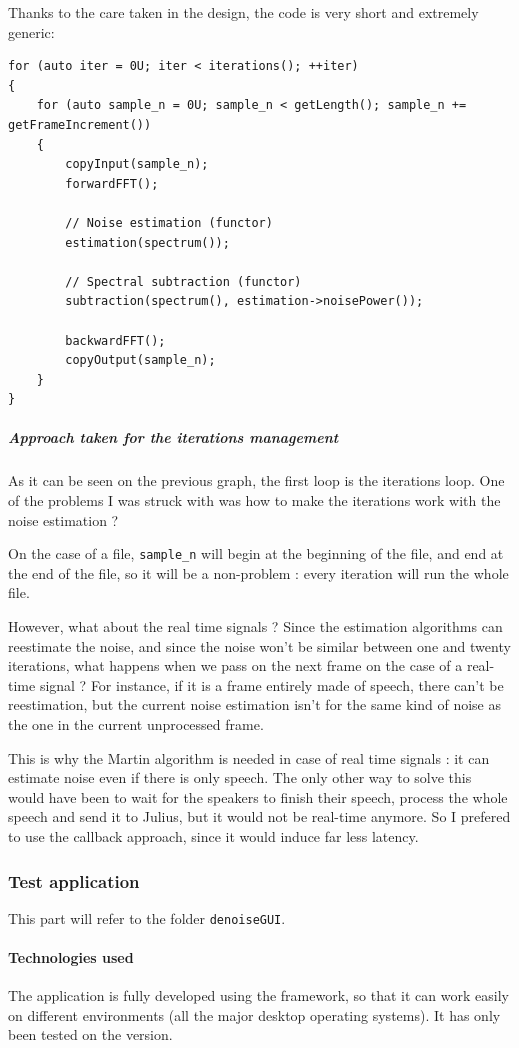 Thanks to the care taken in the design, the code is very short and extremely generic: 
\begin{lstlisting}[caption=\texttt{SubtractionManager::execute()} in subtraction\_manager.cpp]
for (auto iter = 0U; iter < iterations(); ++iter)
{
	for (auto sample_n = 0U; sample_n < getLength(); sample_n += getFrameIncrement())
	{
		copyInput(sample_n);
		forwardFFT();

		// Noise estimation (functor)
		estimation(spectrum());

		// Spectral subtraction (functor)
		subtraction(spectrum(), estimation->noisePower());

		backwardFFT();
		copyOutput(sample_n);
	}
}
\end{lstlisting}

\subparagraph{Approach taken for the iterations management}
As it can be seen on the previous graph, the first loop is the iterations loop. One of the problems I was struck with was how to make the iterations work with the noise estimation ? 

On the case of a file, \texttt{sample\_n} will begin at the beginning of the file, and end at the end of the file, so it will be a non-problem : every iteration will run the whole file.

However, what about the real time signals ?
Since the estimation algorithms can reestimate the noise, and since the noise won't be similar between one and twenty iterations, what happens when we pass on the next frame on the case of a real-time signal ? For instance, if it is a frame entirely made of speech, there can't be reestimation, but the current noise estimation isn't for the same kind of noise as the one in the current unprocessed frame.

This is why the Martin algorithm is needed in case of real time signals : it can estimate noise even if there is only speech. The only other way to solve this would have been to wait for the speakers to finish their speech, process the whole speech and send it to Julius, but it would not be real-time anymore. So I prefered to use the callback approach, since it would induce far less latency.

\subsubsection{Test application}
This part will refer to the folder \texttt{denoiseGUI}. 
\paragraph{Technologies used}
The application is fully developed using the  framework, so that it can work easily on different environments (all the major desktop operating systems). It has only been tested on the  version.

